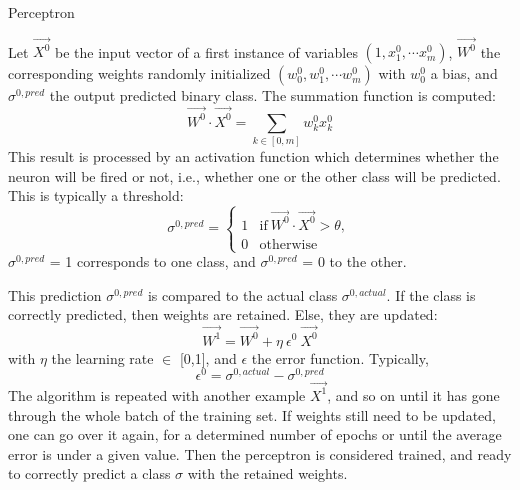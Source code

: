 \begin{algorithm}
      \caption{Perceptron}\label{alg:perceptron}
      \begin{algorithmic}[1]
        \STATEx Let \( \overrightarrow{X^0} \) be the input vector of a first instance of variables \( (1, x_1^0, \cdots x_m^0) \), \( \overrightarrow{W^0} \) the corresponding weights  randomly initialized \( (w_0^0, w_1^0, \cdots w_m^0) \) with \(w_0^0\) a bias, and $\sigma^{0, pred}$ the output predicted binary class. 
        \STATE The summation function is computed: 
        \begin{equation}
            \overrightarrow{W^0} \cdot \overrightarrow{X^0} = \sum_{k \in [0,m]} w_k^0 x_k^0
        \end{equation}
        \STATE This result is processed by an activation function which determines whether the neuron will be fired or not, i.e., whether one or the other class will be predicted. This is typically a threshold: 
        \begin{equation}
            \sigma^{0,pred} = 
            \begin{cases}
                1 & \text{if} \ \overrightarrow{W^0} \cdot \overrightarrow{X^0} > \theta,\\
                0 & \text{otherwise}
            \end{cases}
        \end{equation}
        \STATEx $\sigma^{0,pred}$ = 1 corresponds to one class, and $\sigma^{0,pred}$ = 0 to the other. 
      \end{algorithmic}
\end{algorithm}

\begin{algorithm}
      \begin{algorithmic}[1]
        \STATE This prediction $\sigma^{0,pred}$ is compared to the actual class $\sigma^{0,actual}$. 
        \STATEx If the class is correctly predicted, then weights are retained.
        \STATEx Else, they are updated: 
        \begin{equation}
            \overrightarrow{W^1} = \overrightarrow{W^0} + \eta \ \epsilon^0 \ \overrightarrow{X^0}
        \end{equation}
        \STATEx with $\eta$ the learning rate $\in$ [0,1], and $\epsilon$ the error function. Typically, 
        \begin{equation}
            \epsilon^0 = \sigma^{0,actual} - \sigma^{0,pred}
        \end{equation}
        \STATE The algorithm is repeated with another example $\overrightarrow{X^1}$, and so on until it has gone through the whole batch of the training set. If weights still need to be updated, one can go over it again, for a determined number of epochs or until the average error is under a given value. Then the perceptron is considered trained, and ready to correctly predict a class $\sigma$ with the retained weights.
      \end{algorithmic}
\end{algorithm}

